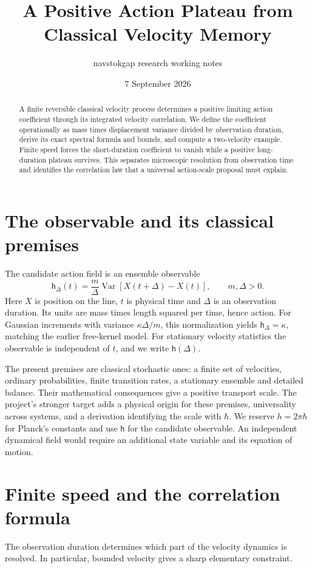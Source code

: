 \documentclass[11pt,a4paper]{article}
\title{A Positive Action Plateau from Classical Velocity Memory}
\author{navstokgap research working notes}
\date{7 September 2026}
\newcommand{\Var}{\operatorname{Var}}
\newcommand{\ha}{\mathsf h}
\begin{document}
\maketitle
\begin{abstract}
A finite reversible classical velocity process determines a positive limiting
action coefficient through its integrated velocity correlation. We define the
coefficient operationally as mass times displacement variance divided by
observation duration, derive its exact spectral formula and bounds, and compute
a two-velocity example. Finite speed forces the short-duration coefficient to
vanish while a positive long-duration plateau survives. This separates
microscopic resolution from observation time and identifies the correlation
law that a universal action-scale proposal must explain.
\end{abstract}

\section{The observable and its classical premises}
The candidate action field is an ensemble observable
\begin{equation}\label{eq:def}
 \ha_\Delta(t)=\frac{m}{\Delta}\Var[X(t+\Delta)-X(t)],\qquad m,\Delta>0.
\end{equation}
Here $X$ is position on the line, $t$ is physical time and $\Delta$ is an
observation duration. Its units are mass times length squared per time, hence
action. For Gaussian increments with variance $\kappa\Delta/m$, this
normalization yields $\ha_\Delta=\kappa$, matching the earlier free-kernel
model. For stationary velocity statistics the observable is independent of
$t$, and we write $\ha(\Delta)$.

The present premises are classical stochastic ones: a finite set of velocities,
ordinary probabilities, finite transition rates, a stationary ensemble and
detailed balance. Their mathematical consequences give a positive transport
scale. The project's stronger target adds a physical origin for these premises,
universality across systems, and a derivation identifying the scale with
$\hbar$. We reserve $h=2\pi\hbar$ for Planck's constants and use $\ha$ for
the candidate observable. An independent dynamical field would require an
additional state variable and its equation of motion.

\section{Finite speed and the correlation formula}
The observation duration determines which part of the velocity dynamics is
resolved. In particular, bounded velocity gives a sharp elementary constraint.
\end{document}

